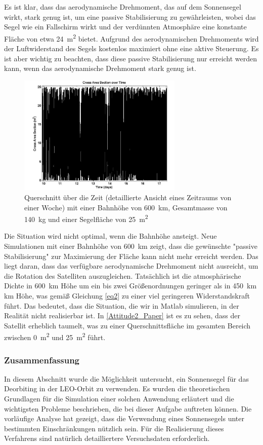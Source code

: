 \documentclass{article}
\begin{document}
Es ist klar, dass das aerodynamische Drehmoment, das auf dem Sonnensegel wirkt, stark genug ist, um eine passive Stabilisierung zu gewährleisten, wobei das Segel wie ein Fallschirm wirkt und der verdünnten Atmosphäre eine konstante Fläche von etwa \SI{24}{\square \meter} bietet. Aufgrund des aerodynamischen Drehmoments wird der Luftwiderstand des Segels kostenlos maximiert ohne eine aktive Steuerung. Es ist aber wichtig zu beachten, dass diese passive Stabilisierung nur erreicht werden kann, wenn das aerodynamische Drehmoment stark genug ist. 
\begin{figure}[htbp]
	\centering
	\includegraphics[width=0.7\textwidth]{bilder/Attitude2_Paper.png}
	\caption{Querschnitt über die Zeit (detaillierte Ansicht eines Zeitraums von einer Woche) mit einer Bahnhöhe von \SI{600}{\kilo\meter},  Gesamtmasse von \SI{140}{\kilogram} und einer Segelfläche von \SI{25}{\square \meter}}
	\label{Attitude2_Paper}
\end{figure}
Die Situation wird nicht optimal, wenn die Bahnhöhe ansteigt. Neue Simulationen mit einer Bahnhöhe von \SI{600}{\kilo\meter} zeigt, dass die gewünschte "passive Stabilisierung" zur Maximierung der Fläche kann nicht mehr erreicht werden. Das liegt daran, dass das verfügbare aerodynamische Drehmoment nicht ausreicht, um die Rotation des Satelliten auszugleichen. Tatsächlich ist die atmosphärische Dichte in \SI{600}{\kilo\meter} Höhe um ein bis zwei Größenordnungen geringer als in \SI{450}{\kilo\meter} km Höhe, was gemäß Gleichung \autoref{eq2} zu einer viel geringeren Widerstandskraft führt. Das bedeutet, dass die Situation, die wir in Matlab simulieren, in der Realität nicht realisierbar ist. In \autoref{Attitude2_Paper} ist es zu sehen, dass der Satellit erheblich taumelt, was zu einer Querschnittsfläche im gesamten Bereich zwischen \SI{0}{\square \meter} und \SI{25}{\square \meter} führt.
\subsubsection{Zusammenfassung}
In diesem Abschnitt wurde die Möglichkeit untersucht, ein Sonnensegel für das Deorbiting in der LEO-Orbit zu verwenden. Es wurden die theoretischen Grundlagen für die Simulation einer solchen Anwendung erläutert und die wichtigsten Probleme beschrieben, die bei dieser Aufgabe auftreten können. Die vorläufige Analyse hat gezeigt, dass die Verwendung eines Sonnensegels unter bestimmten Einschränkungen nützlich sein. Für die Realisierung dieses Verfahrens sind natürlich detailliertere Versuchsdaten erforderlich.
\end{document}
